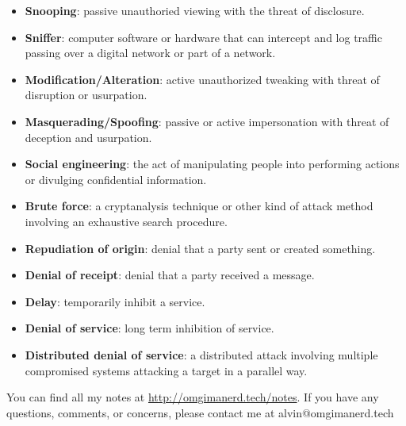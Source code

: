 \documentclass{math}
\begin{document}
\begin{itemize}
  \item \textbf{Snooping}: passive unauthoried viewing with the threat of
    disclosure.
  \item \textbf{Sniffer}: computer software or hardware that can intercept and
    log traffic passing over a digital network or part of a network.
  \item \textbf{Modification/Alteration}: active unauthorized tweaking with
    threat of disruption or usurpation.
  \item \textbf{Masquerading/Spoofing}: passive or active impersonation with
    threat of deception and usurpation.
  \item \textbf{Social engineering}: the act of manipulating people into
    performing actions or divulging confidential information.
  \item \textbf{Brute force}: a cryptanalysis technique or other kind of
    attack method involving an exhaustive search procedure.
  \item \textbf{Repudiation of origin}: denial that a party sent or created
    something.
  \item \textbf{Denial of receipt}: denial that a party received a message.
  \item \textbf{Delay}: temporarily inhibit a service.
  \item \textbf{Denial of service}: long term inhibition of service.
  \item \textbf{Distributed denial of service}: a distributed attack involving
    multiple compromised systems attacking a target in a parallel way.
\end{itemize}

\begin{center}
  You can find all my notes at \url{http://omgimanerd.tech/notes}. If you have
  any questions, comments, or concerns, please contact me at
  alvin@omgimanerd.tech
\end{center}
\end{document}
